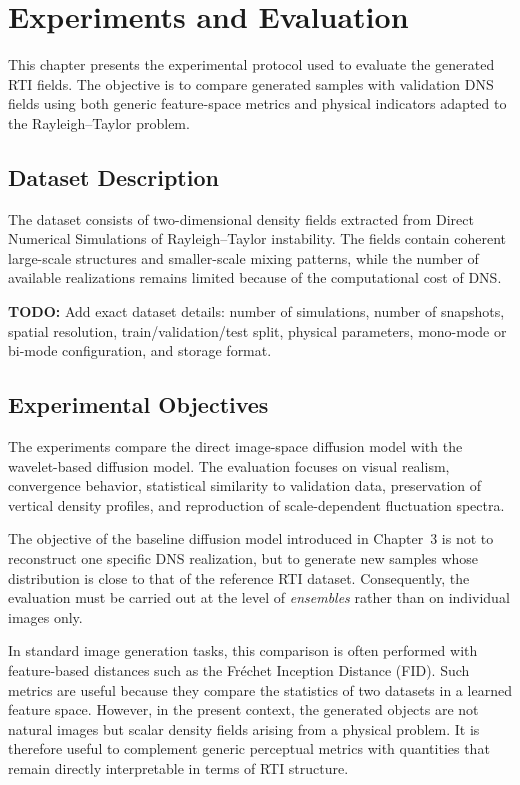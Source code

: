 ﻿\chapter{Experiments and Evaluation}
\label{chap:experiments}

This chapter presents the experimental protocol used to evaluate the generated RTI fields. The objective is to compare generated samples with validation DNS fields using both generic feature-space metrics and physical indicators adapted to the Rayleigh--Taylor problem.

\section{Dataset Description}

The dataset consists of two-dimensional density fields extracted from Direct Numerical Simulations of Rayleigh--Taylor instability. The fields contain coherent large-scale structures and smaller-scale mixing patterns, while the number of available realizations remains limited because of the computational cost of DNS.

\textbf{TODO:} Add exact dataset details: number of simulations, number of snapshots, spatial resolution, train/validation/test split, physical parameters, mono-mode or bi-mode configuration, and storage format.

\section{Experimental Objectives}

The experiments compare the direct image-space diffusion model with the wavelet-based diffusion model. The evaluation focuses on visual realism, convergence behavior, statistical similarity to validation data, preservation of vertical density profiles, and reproduction of scale-dependent fluctuation spectra.

The objective of the baseline diffusion model introduced in Chapter~3 is not to
reconstruct one specific DNS realization, but to generate new samples whose
distribution is close to that of the reference RTI dataset. Consequently, the
evaluation must be carried out at the level of \emph{ensembles} rather than on
individual images only.

In standard image generation tasks, this comparison is often performed with
feature-based distances such as the Fr\'echet Inception Distance (FID). Such
metrics are useful because they compare the statistics of two datasets in a
learned feature space. However, in the present context, the generated objects
are not natural images but scalar density fields arising from a physical
problem. It is therefore useful to complement generic perceptual metrics with
quantities that remain directly interpretable in terms of RTI structure.

